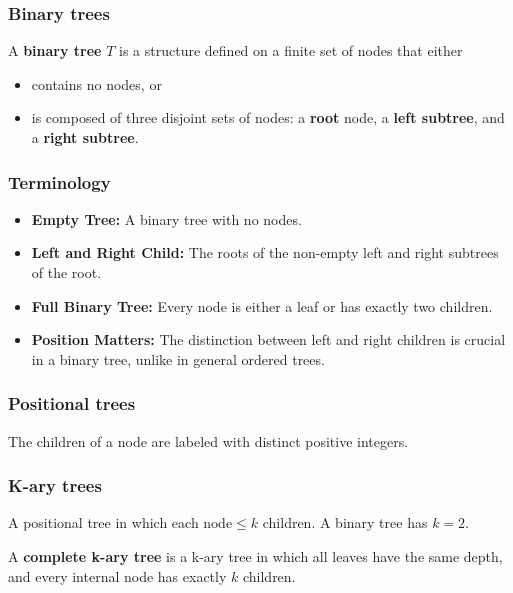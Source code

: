     \subsubsection{Binary trees}
    \begin{definition}
        A \textbf{binary tree} $T$ is a structure defined on a finite set of nodes that either
        \begin{itemize}
            \item contains no nodes, or 
            \item is composed of three disjoint sets of nodes: a \textbf{root} node, a \textbf{left subtree}, and a \textbf{right subtree}.
        \end{itemize}
    \end{definition}

    \subsubsection{Terminology}
    \begin{terminology}
        \begin{itemize}
            \item \textbf{Empty Tree:} A binary tree with no nodes.
            \item \textbf{Left and Right Child:} The roots of the non-empty left and right subtrees of the root.
            \item \textbf{Full Binary Tree:} Every node is either a leaf or has exactly two children.
            \item \textbf{Position Matters:} The distinction between left and right children is crucial in a binary tree, unlike in general ordered trees.
        \end{itemize}
    \end{terminology}

    \subsubsection{Positional trees}
    \begin{definition}
        The children of a node are labeled with distinct positive integers.
    \end{definition}

    \subsubsection{K-ary trees}
    \begin{definition}
            A positional tree in which each $\text{node} \leq k$ children. A binary tree has \( k = 2 \).
            \vspace{1em}

            A \textbf{complete k-ary tree} is a k-ary tree in which all leaves have the same depth, and every internal node has exactly \( k \) children. 
    \end{definition}

    

